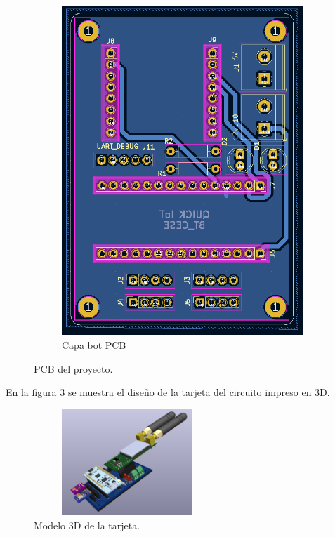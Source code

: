 \begin{figure}[h!]
\begin{subfigure}[b]{0.27\linewidth}
  \includegraphics[width=\linewidth]{./Figures/pcb_bot.png}
  \caption{Capa bot PCB}
  \label{fig:Capa bot PCB}
  \end{subfigure}
  \caption{PCB del proyecto.}
  \label{fig:PCB del proyecto}
\end{figure}

En la figura \ref{fig:3D del modulo} se muestra el diseño de la tarjeta del circuito impreso en 3D.
\begin{figure}[h!]
  \centering
	\includegraphics[width=7cm, height=4cm]{./Figures/tarjeta3d.png}
  \caption{Modelo 3D de la tarjeta.}
	\label{fig:3D del modulo}
\end{figure}
